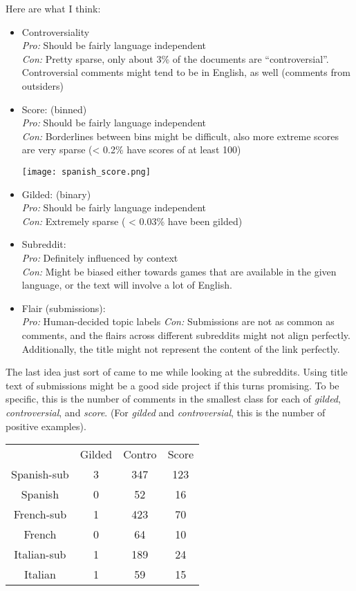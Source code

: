 \documentclass[11pt]{article} %
\begin{document}
Here are what I think:
\begin{itemize}
\item Controversiality \\
\emph{Pro:} Should be fairly language independent \\
\emph{Con:} Pretty sparse, only about 3\% of the documents are ``controversial''. Controversial comments might tend to be in English, as well (comments from outsiders)

\item Score: (binned) \\
\emph{Pro:} Should be fairly language independent \\
\emph{Con:} Borderlines between bins might be difficult, also more extreme scores are very sparse (< 0.2\% have scores of at least 100)

\texttt{[image: spanish\_score.png]}

\item Gilded: (binary) \\
\emph{Pro:} Should be fairly language independent \\
\emph{Con:} Extremely sparse ( < 0.03\% have been gilded)

\item Subreddit: \\
\emph{Pro:} Definitely influenced by context \\
\emph{Con:} Might be biased either towards games that are available in the given language, or the text will involve a lot of English.

\item Flair (submissions): \\
\emph{Pro:} Human-decided topic labels
\emph{Con:} Submissions are not as common as comments, and the flairs across different subreddits might not align perfectly. Additionally, the title might not represent the content of the link perfectly.
\end{itemize}

The last idea just sort of came to me while looking at the subreddits. Using title text of submissions might be a good side project if this turns promising. To be specific, this is the number of comments in the smallest class for each of \emph{gilded}, \emph{controversial}, and \emph{score}. (For \emph{gilded} and \emph{controversial}, this is the number of positive examples). \\

\begin{tabular}{|c|c|c|c|}
& Gilded&Contro &Score \\
Spanish-sub & 3& 347& 123\\
Spanish & 0& 52& 16\\
French-sub & 1& 423& 70\\
French & 0 & 64& 10\\
Italian-sub & 1& 189& 24\\
Italian & 1& 59& 15\\
\end{tabular}
\end{document}

